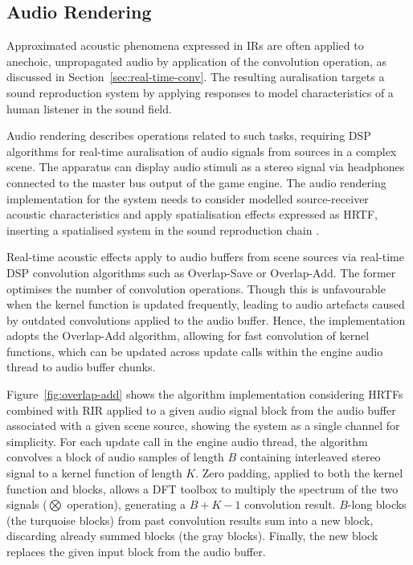 \subsection{Audio Rendering}
Approximated acoustic phenomena expressed in IRs are often applied to anechoic, unpropagated audio by application of the convolution operation, as discussed in Section~\ref{sec:real-time-conv}. The resulting auralisation targets a sound reproduction system by applying responses to model characteristics of a human listener in the sound field.\par
Audio rendering describes operations related to such tasks, requiring DSP algorithms for real-time auralisation of audio signals from sources in a complex scene. The apparatus can display audio stimuli as a stereo signal via headphones connected to the master bus output of the game engine. The audio rendering implementation for the system needs to consider modelled source-receiver acoustic characteristics and apply spatialisation effects expressed as HRTF, inserting a spatialised system in the sound reproduction chain \citep{liu2022sound}.\par
Real-time acoustic effects apply to audio buffers from scene sources via real-time DSP convolution algorithms such as Overlap-Save or Overlap-Add. The former optimises the number of convolution operations. Though this is unfavourable when the kernel function is updated frequently, leading to audio artefacts caused by outdated convolutions applied to the audio buffer. Hence, the implementation adopts the Overlap-Add algorithm, allowing for fast convolution of kernel functions, which can be updated across update calls within the engine audio thread to audio buffer chunks.\par
Figure~\ref{fig:overlap-add} shows the algorithm implementation considering HRTFs combined with RIR applied to a given audio signal block from the audio buffer associated with a given scene source, showing the system as a single channel for simplicity. For each update call in the engine audio thread, the algorithm convolves a block of audio samples of length $B$ containing interleaved stereo signal to a kernel function of length $K$. Zero padding, applied to both the kernel function and blocks, allows a DFT toolbox to multiply the spectrum of the two signals ($\bigotimes$ operation), generating a $B+K-1$ convolution result. $B$-long blocks (the turquoise blocks) from past convolution results sum into a new block, discarding already summed blocks (the gray blocks). Finally, the new block replaces the given input block from the audio buffer.\par

